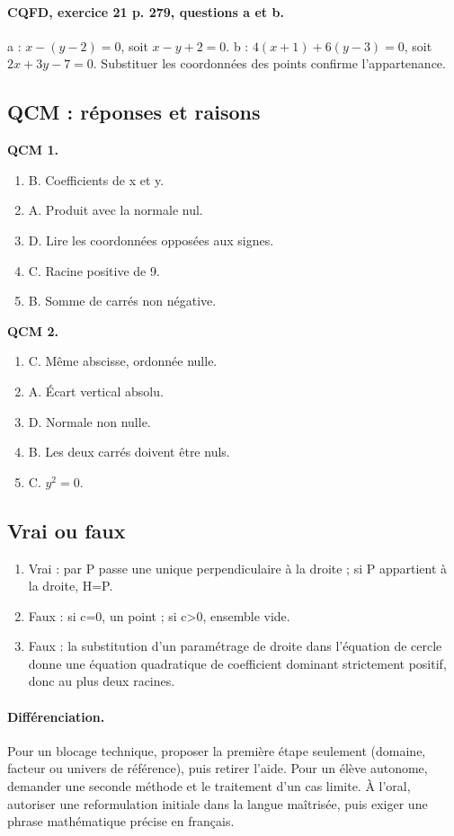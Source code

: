 \paragraph{CQFD, exercice 21 p. 279, questions a et b.} a : $x-(y-2)=0$, soit $x-y+2=0$. b : $4(x+1)+6(y-3)=0$, soit $2x+3y-7=0$. Substituer les coordonnées des points confirme l’appartenance.
\subsection*{QCM : réponses et raisons}
\textbf{QCM 1.}
\begin{enumerate}
\item B. Coefficients de x et y.
\item A. Produit avec la normale nul.
\item D. Lire les coordonnées opposées aux signes.
\item C. Racine positive de 9.
\item B. Somme de carrés non négative.
\end{enumerate}
\textbf{QCM 2.}
\begin{enumerate}
\item C. Même abscisse, ordonnée nulle.
\item A. Écart vertical absolu.
\item D. Normale non nulle.
\item B. Les deux carrés doivent être nuls.
\item C. $y^2=0$.
\end{enumerate}
\subsection*{Vrai ou faux}
\begin{enumerate}
\item Vrai : par P passe une unique perpendiculaire à la droite ; si P appartient à la droite, H=P.
\item Faux : si c=0, un point ; si c>0, ensemble vide.
\item Faux : la substitution d’un paramétrage de droite dans l’équation de cercle donne une équation quadratique de coefficient dominant strictement positif, donc au plus deux racines.
\end{enumerate}
\paragraph{Différenciation.} Pour un blocage technique, proposer la première étape seulement (domaine, facteur ou univers de référence), puis retirer l’aide. Pour un élève autonome, demander une seconde méthode et le traitement d’un cas limite. À l’oral, autoriser une reformulation initiale dans la langue maîtrisée, puis exiger une phrase mathématique précise en français.
